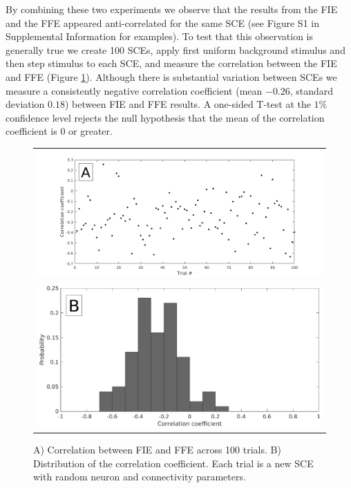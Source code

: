 \documentclass[12pt]{article}
\begin{document}
By combining these two experiments we observe that the results from the FIE and the FFE appeared anti-correlated for the same SCE (see Figure S1 in Supplemental Information for examples).
To test that this observation is generally true we create 100 SCEs, apply first uniform background stimulus and then step stimulus to each SCE, and measure the correlation between the FIE and FFE (Figure \ref{fig:InitiationCorrelation}).
Although there is substantial variation between SCEs we measure a consistently negative correlation coefficient (mean $-0.26$, standard deviation $0.18$) between FIE and FFE results.
\color{red}A one-sided T-test at the $1\%$ confidence level rejects the null hypothesis that the mean of the correlation coefficient is $0$ or greater\color{black}.
\begin{figure}[!htb]
 \centering
 \caption{\color{red} A) Correlation between FIE and FFE across 100 trials. B) Distribution of the correlation coefficient. Each trial is a new SCE with random neuron and connectivity parameters\color{black}. }
 \label{fig:InitiationCorrelation}
 \begin{tabular}{c}
     \includegraphics[width=\textwidth]{fig/InitiationCorrelation} \\ 
     \includegraphics[width=\textwidth]{fig/InitiationCorrelationPDF} 
 \end{tabular}
\end{figure}
\end{document}
